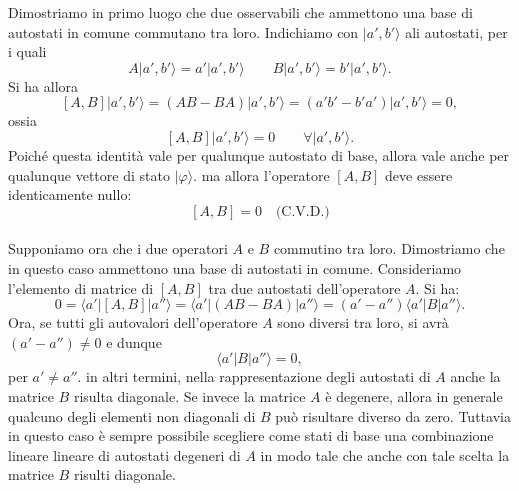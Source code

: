 \documentclass[a4paper,12pt,oneside]{book}
\begin{document}
Dimostriamo in primo luogo che due osservabili che ammettono una base di autostati in comune commutano tra loro. Indichiamo con $\vert a', b' \rangle$ ali autostati, per i quali
	\begin{equation}
		A\vert a', b' \rangle= a'\vert a', b' \rangle \qquad B\vert a', b' \rangle= b'\vert a', b' \rangle.
	\end{equation}
Si ha allora
	\begin{equation}
		\left[ A, B \right]\vert a', b' \rangle = \left(AB-BA\right)\vert a', b' \rangle=\left( a'b'-b'a'\right)\vert a', b' \rangle=0,
	\end{equation}
ossia
	\begin{equation}
		\left[A,B\right]\vert a', b' \rangle=0 \qquad \forall \vert a', b' \rangle.
	\end{equation}
Poiché questa identità vale per qualunque autostato di base, allora vale anche per qualunque vettore di stato $\vert \varphi \rangle$. ma allora l'operatore $\left[ A, B \right]$ deve essere identicamente nullo:
	\begin{equation}
		\left[ A, B \right] =0 \quad \textrm{(C.V.D.)}
	\end{equation}
	\\
	
Supponiamo ora che i due operatori $A$ e $B$ commutino tra loro. Dimostriamo che in questo caso ammettono una base di autostati in comune. Consideriamo l'elemento di matrice di $[A,B]$ tra due autostati dell'operatore $A$. Si ha:
	\begin{equation}
		0 = \langle a' \vert \left[A, B\right] \vert a'' \rangle = \langle a' \vert \left( AB-BA \right) \vert a'' \rangle = \left( a'-a''\right) \langle a' \vert B \vert a'' \rangle . 
	\end{equation}
Ora, se tutti gli autovalori dell'operatore $A$ sono diversi tra loro, si avrà $(a'-a'') \neq 0$ e dunque
	\begin{equation}
		\langle a' \vert B \vert a'' \rangle =0,
	\end{equation}
per $a' \neq a''$.
in altri termini, nella rappresentazione degli autostati di $A$ anche la matrice $B$ risulta diagonale. Se invece la matrice $A$ è degenere, allora in generale qualcuno degli elementi non diagonali di $B$ può risultare diverso da zero. Tuttavia in questo caso è sempre possibile scegliere come stati di base una combinazione lineare lineare di autostati degeneri di $A$ in modo tale che anche con tale scelta la matrice $B$ risulti diagonale.\\
\end{document}
